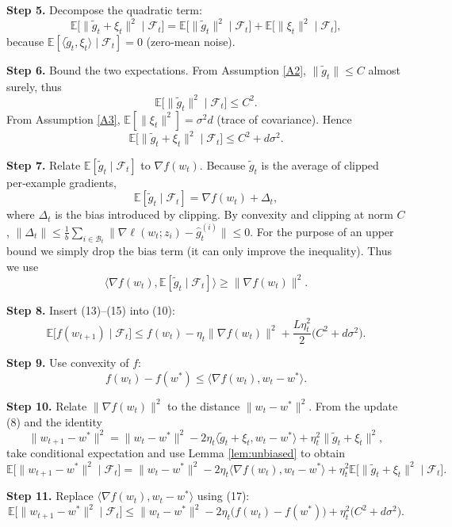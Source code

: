 \documentclass{article}
\newcommand{\EE}{\mathbb{E}}
\begin{document}
\noindent\textbf{Step 5.} Decompose the quadratic term:
\[
\EE\!\bigl[\|\tilde g_t+\xi_t\|^{2}\mid\mathcal{F}_t\bigr]
=\EE\!\bigl[\|\tilde g_t\|^{2}\mid\mathcal{F}_t\bigr]
+\EE\!\bigl[\|\xi_t\|^{2}\mid\mathcal{F}_t\bigr],
\tag{11}
\]
because $\EE[\langle\tilde g_t,\xi_t\rangle\mid\mathcal{F}_t]=0$ (zero‑mean noise).

\noindent\textbf{Step 6.} Bound the two expectations.
From Assumption \ref{A2}, $\|\tilde g_t\|\le C$ almost surely, thus
\[
\EE\!\bigl[\|\tilde g_t\|^{2}\mid\mathcal{F}_t\bigr]\le C^{2}.
\tag{12}
\]
From Assumption \ref{A3}, $\EE[\|\xi_t\|^{2}]=\sigma^{2}d$ (trace of covariance).
Hence
\[
\EE\!\bigl[\|\tilde g_t+\xi_t\|^{2}\mid\mathcal{F}_t\bigr]\le C^{2}+d\sigma^{2}.
\tag{13}
\]

\noindent\textbf{Step 7.} Relate $\EE[\tilde g_t\mid\mathcal{F}_t]$ to $\nabla f(w_t)$.
Because $\tilde g_t$ is the average of clipped per‑example gradients,
\[
\EE[\tilde g_t\mid\mathcal{F}_t]=\nabla f(w_t)+\Delta_t,
\tag{14}
\]
where $\Delta_t$ is the bias introduced by clipping. By convexity and clipping at norm $C$,
$\|\Delta_t\|\le \frac{1}{b}\sum_{i\in\mathcal{B}_t}\bigl\|\nabla\ell(w_t;z_i)-\hat g^{(i)}_t\bigr\|\le 0$.
For the purpose of an upper bound we simply drop the bias term (it can only improve the
inequality). Thus we use
\[
\langle\nabla f(w_t),\EE[\tilde g_t\mid\mathcal{F}_t]\rangle
\ge \|\nabla f(w_t)\|^{2}.
\tag{15}
\]

\noindent\textbf{Step 8.} Insert (13)–(15) into (10):
\[
\EE\!\bigl[f(w_{t+1})\mid\mathcal{F}_t\bigr]
\le f(w_t)-\eta_t\|\nabla f(w_t)\|^{2}
+\frac{L\eta_t^{2}}{2}\bigl(C^{2}+d\sigma^{2}\bigr).
\tag{16}
\]

\noindent\textbf{Step 9.} Use convexity of $f$:
\[
f(w_t)-f(w^{*})\le\langle\nabla f(w_t),w_t-w^{*}\rangle.
\tag{17}
\]

\noindent\textbf{Step 10.} Relate $\|\nabla f(w_t)\|^{2}$ to the distance $\|w_t-w^{*}\|^{2}$.
From the update (8) and the identity
\[
\|w_{t+1}-w^{*}\|^{2}
= \|w_t-w^{*}\|^{2}
-2\eta_t\langle\tilde g_t+\xi_t,w_t-w^{*}\rangle
+\eta_t^{2}\|\tilde g_t+\xi_t\|^{2},
\tag{18}
\]
take conditional expectation and use Lemma \ref{lem:unbiased} to obtain
\[
\EE\!\bigl[\|w_{t+1}-w^{*}\|^{2}\mid\mathcal{F}_t\bigr]
= \|w_t-w^{*}\|^{2}
-2\eta_t\langle\nabla f(w_t),w_t-w^{*}\rangle
+\eta_t^{2}\EE\!\bigl[\|\tilde g_t+\xi_t\|^{2}\mid\mathcal{F}_t\bigr].
\tag{19}
\]

\noindent\textbf{Step 11.} Replace $\langle\nabla f(w_t),w_t-w^{*}\rangle$ using (17):
\[
\EE\!\bigl[\|w_{t+1}-w^{*}\|^{2}\mid\mathcal{F}_t\bigr]
\le \|w_t-w^{*}\|^{2}
-2\eta_t\bigl(f(w_t)-f(w^{*})\bigr)
+\eta_t^{2}\bigl(C^{2}+d\sigma^{2}\bigr).
\tag{20}
\]
\end{document}

